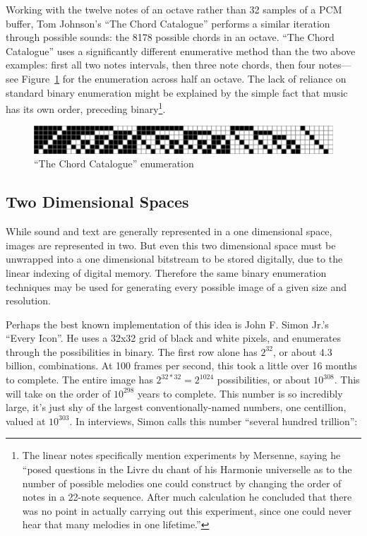 \documentclass{thesis}
\begin{document}
Working with the twelve notes of an octave rather than 32 samples of a PCM buffer, Tom Johnson's ``The Chord Catalogue''\cite{tom_johnson_liner_1999} performs a similar iteration through possible sounds: the 8178 possible chords in an octave. ``The Chord Catalogue'' uses a significantly different enumerative method than the two above examples: first all two notes intervals, then three note chords, then four notes---see Figure~\ref{chord-bitmap} for the enumeration across half an octave. The lack of reliance on standard binary enumeration might be explained by the simple fact that music has its own order, preceding binary\footnote{The linear notes specifically mention experiments by Mersenne, saying he ``posed questions in the Livre du chant of his Harmonie universelle as to the number of possible melodies one could construct by changing the order of notes in a 22-note sequence. After much calculation he concluded that there was no point in actually carrying out this experiment, since one could never hear that many melodies in one lifetime.''}.

\begin{figure}
	\begin{center}
		\includegraphics[scale=.8]{graphics/chord-bitmap.pdf}
		\caption{``The Chord Catalogue'' enumeration}
		\label{chord-bitmap}
	\end{center}
\end{figure}

\subsection{Two Dimensional Spaces}

While sound and text are generally represented in a one dimensional space, images are represented in two. But even this two dimensional space must be unwrapped into a one dimensional bitstream to be stored digitally, due to the linear indexing of digital memory. Therefore the same binary enumeration techniques may be used for generating every possible image of a given size and resolution.
	
Perhaps the best known implementation of this idea is John F. Simon Jr.'s ``Every Icon''\cite{john_f._simon_jr._every_????}. He uses a 32x32 grid of black and white pixels, and enumerates through the possibilities in binary. The first row alone has $2^{32}$, or about 4.3 billion, combinations. At 100 frames per second, this took a little over 16 months to complete. The entire image has $2^{32*32}=2^{1024}$ possibilities, or about $10^{308}$. This will take on the order of $10^{298}$ years to complete. This number is so incredibly large, it's just shy of the largest conventionally-named numbers, one centillion, valued at $10^{303}$. In interviews, Simon calls this number ``several hundred trillion''\cite{matthew_mirapaul_in_1997}:
	
\end{document}
